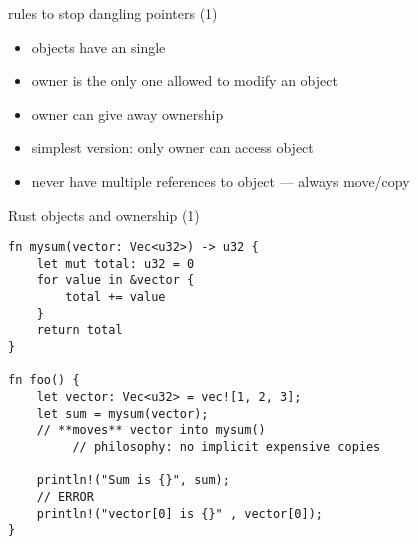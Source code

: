\begin{frame}{rules to stop dangling pointers (1)}
    \begin{itemize}
    \item objects have an single 
    \item owner is the only one allowed to modify an object
    \item owner can give away ownership
    \item simplest version: only owner can access object
    \item never have multiple references to object --- always move/copy
    \end{itemize}
\end{frame}

\begin{frame}[fragile,label=rustOwnership1]{Rust objects and ownership (1)}
    \begin{verbatim}
fn mysum(vector: Vec<u32>) -> u32 {
    let mut total: u32 = 0
    for value in &vector {
        total += value
    }
    return total
}

fn foo() {
    let vector: Vec<u32> = vec![1, 2, 3];
    let sum = mysum(vector);
    // **moves** vector into mysum()
         // philosophy: no implicit expensive copies
    
    println!("Sum is {}", sum);
    // ERROR
    println!("vector[0] is {}" , vector[0]);
}
\end{verbatim}
\end{frame}

